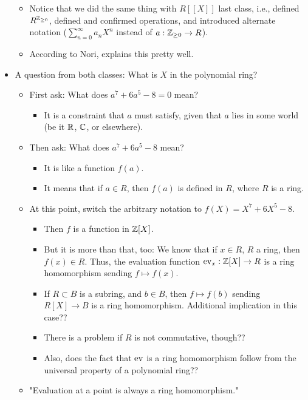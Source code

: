 \documentclass[../notes.tex]{subfiles}
\begin{document}
\begin{itemize}
\begin{itemize}
        \item Notice that we did the same thing with $R[[X]]$ last class, i.e., defined $R^{\mathbb{Z}_{\geq 0}}$, defined and confirmed operations, and introduced alternate notation ($\sum_{n=0}^\infty a_nX^n$ instead of $a:{\mathbb{Z}_{\geq 0}}\to R$).
        \item According to Nori, \textcite{bib:DummitFoote} explains this pretty well.
    \end{itemize}
    \item A question from both classes: What is $X$ in the polynomial ring?
    \begin{itemize}
        \item First ask: What does $a^7+6a^5-8=0$ mean?
        \begin{itemize}
            \item It is a constraint that $a$ must satisfy, given that $a$ lies in some world (be it $\mathbb{R}$, $\mathbb{C}$, or elsewhere).
        \end{itemize}
        \item Then ask: What does $a^7+6a^5-8$ mean?
        \begin{itemize}
            \item It is like a function $f(a)$.
            \item It means that if $a\in R$, then $f(a)$ is defined in $R$, where $R$ is a ring.
        \end{itemize}
        \item At this point, switch the arbitrary notation to $f(X)=X^7+6X^5-8$.
        \begin{itemize}
            \item Then $f$ is a function in $\mathbb{Z}[X]$.
            \item But it is more than that, too: We know that if $x\in R$, $R$ a ring, then $f(x)\in R$. Thus, the evaluation function $\operatorname{ev}_x:\mathbb{Z}[X]\to R$ is a ring homomorphism sending $f\mapsto f(x)$.
            \item If $R\subset B$ is a subring, and $b\in B$, then $f\mapsto f(b)$ sending $R[X]\to B$ is a ring homomorphism. Additional implication in this case??
            \item There is a problem if $R$ is not commutative, though??
            \item Also, does the fact that $\operatorname{ev}$ is a ring homomorphism follow from the universal property of a polynomial ring??
        \end{itemize}
        \item "Evaluation at a point is always a ring homomorphism."

\end{itemize}
\end{itemize}
\end{document}
